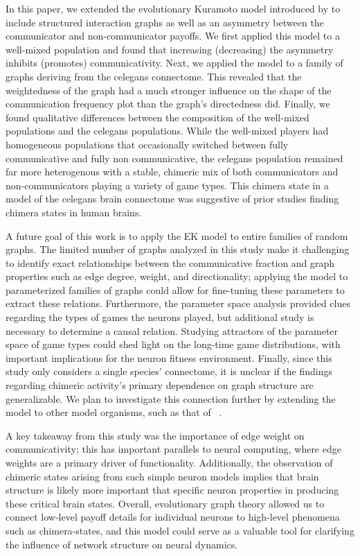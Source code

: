 \documentclass[pdflatex,twocolumn,sn-nature,super]{sn-jnl}
\begin{document}
In this paper, we extended the evolutionary Kuramoto model
introduced by \tripp{}
to include structured interaction graphs
as well as an asymmetry between
the communicator and non-communicator payoffs.
We first applied this model to a well-mixed population
and found that increasing (decreasing) the asymmetry
inhibits (promotes) communicativity.
Next, we applied the model to
a family of graphs deriving from the \gls{celegans} connectome.
This revealed that the weightedness of the graph
had a much stronger influence on the shape of the communication frequency plot
than the graph's directedness did.
Finally, we found qualitative differences between the composition
of the well-mixed populations and the \gls{celegans} populations.
While the well-mixed players had homogeneous populations
that occasionally switched between fully communicative
and fully non communicative,
the \gls{celegans} population remained far more heterogenous
with a stable, chimeric mix of both communicators and non-communicators
playing a variety of game types.
This chimera state in a model of the \gls{celegans} brain connectome
was suggestive of prior studies finding chimera states in human brains.

A future goal of this work is to apply the EK model
to entire families of random graphs.
The limited number of graphs analyzed in this study
make it challenging to identify exact relationships
between the communicative fraction and graph properties
such as edge degree, weight, and directionality;
applying the model to parameterized families of graphs could allow
for fine-tuning these parameters to extract these relations.
Furthermore, the parameter space analysis provided clues
regarding the types of games the neurons played,
but additional study is necessary to determine a causal relation.
Studying attractors
of the parameter space of game types
could shed light on the long-time game distributions,
with important implications for the neuron fitness environment.
Finally, since this study only considers a single species' connectome,
it is unclear if the findings regarding chimeric activity's
primary dependence on graph structure are generalizable.
We plan to investigate this connection further
by extending the model to other model organisms,
such as that of
~\citep{schlegel2024whole}.

A key takeaway from this study was the importance
of edge weight on communicativity;
this has important parallels to neural computing,
where edge weights are a primary driver of functionality.
Additionally, the observation of chimeric states
arising from such simple neuron models
implies that brain structure is likely
more important that specific neuron properties
in producing these critical brain states.
Overall, evolutionary graph theory allowed us
to connect low-level payoff details for individual neurons
to high-level phenomena such as chimera-states,
and this model could serve as a valuable tool
for clarifying the influence of network structure on neural dynamics.
\end{document}
